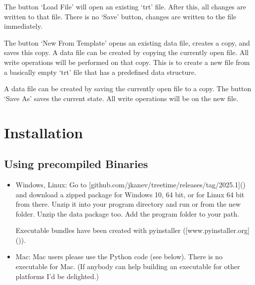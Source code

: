 \documentclass[letterpaper,10pt,english]{sphinxmanual}
\begin{document}
\sphinxAtStartPar
The button ‘Load File’ will open an existing ‘trt’ file. After this, all changes are written to that file. There is no ‘Save’ button, changes are written to the file immediately.

\sphinxAtStartPar
The button ‘New From Template’ opens an existing data file, creates a copy, and saves this copy. A data file can be created by copying the currently open file. All write operations will be performed on that copy. This is to create a new file from a basically empty ‘trt’ file that has a pre\sphinxhyphen{}defined data structure.

\sphinxAtStartPar
A data file can be created by saving the currently open file to a copy. The button ‘Save As’ saves the current state. All write operations will be on the new file.


\section{Installation}
\label{\detokenize{introduction:installation}}

\subsection{Using pre\sphinxhyphen{}compiled Binaries}
\label{\detokenize{introduction:using-pre-compiled-binaries}}\begin{itemize}
\item {} 
\sphinxAtStartPar
Windows, Linux: Go to {[}github.com/jkanev/treetime/releases/tag/2025.1{]}() and download a zipped package for Windows 10, 64 bit, or for Linux 64 bit from there. Unzip it into your program directory and run  or  from the new folder. Unzip the data package too. Add the program folder to your path.

\sphinxAtStartPar
Executable bundles have been created with pyinstaller ({[}www.pyinstaller.org{]}()).

\item {} 
\sphinxAtStartPar
Mac: Mac users please use the Python code (see below). There is no executable for Mac.
(If anybody can help building an executable for other platforms I’d be delighted.)

\end{itemize}
\end{document}
